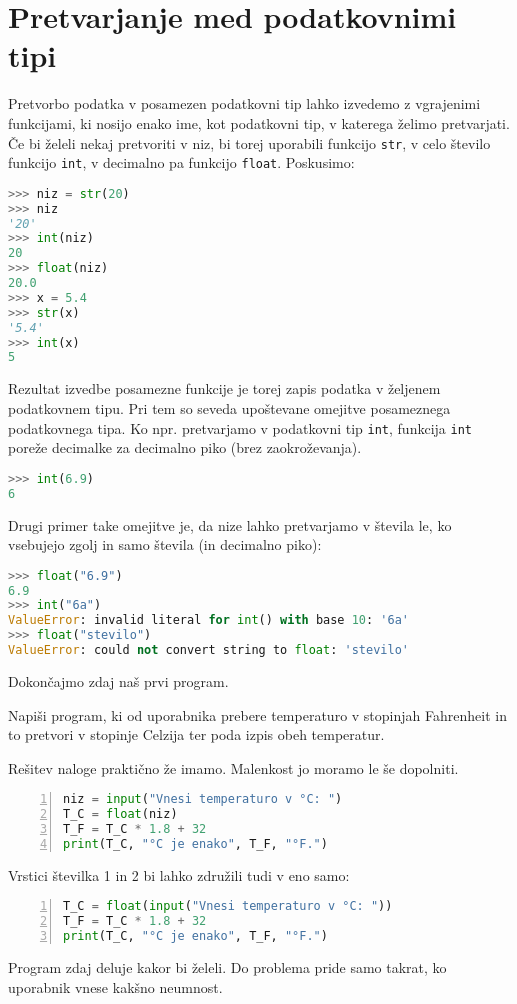 \section{Pretvarjanje med podatkovnimi tipi}
Pretvorbo podatka v posamezen podatkovni tip lahko izvedemo z vgrajenimi funkcijami, ki nosijo enako ime, kot podatkovni tip, v katerega želimo pretvarjati. Če bi želeli nekaj pretvoriti v niz, bi torej uporabili funkcijo \texttt{str}, v celo število funkcijo \texttt{int}, v decimalno pa funkcijo \texttt{float}. Poskusimo:
\begin{lstlisting}[language=Python]
>>> niz = str(20)
>>> niz
'20'
>>> int(niz)
20
>>> float(niz)
20.0
>>> x = 5.4
>>> str(x)
'5.4'
>>> int(x)
5
\end{lstlisting}
Rezultat izvedbe posamezne funkcije je torej zapis podatka v željenem podatkovnem tipu. Pri tem so seveda upoštevane omejitve posameznega podatkovnega tipa. Ko npr. pretvarjamo v podatkovni tip \texttt{int}, funkcija \texttt{int} poreže decimalke za decimalno piko (brez zaokroževanja). 
\begin{lstlisting}[language=Python]
>>> int(6.9)
6
\end{lstlisting}
Drugi primer take omejitve je, da nize lahko pretvarjamo v števila le, ko vsebujejo zgolj in samo števila (in decimalno piko):
\begin{lstlisting}[language=Python]
>>> float("6.9")
6.9
>>> int("6a")
ValueError: invalid literal for int() with base 10: '6a'
>>> float("stevilo")
ValueError: could not convert string to float: 'stevilo'
\end{lstlisting}

Dokončajmo zdaj naš prvi program.
\begin{zgled}
Napiši program, ki od uporabnika prebere temperaturo v stopinjah Fahrenheit in to pretvori v stopinje Celzija ter poda izpis obeh temperatur.
\end{zgled}
\begin{resitev}
Rešitev naloge praktično že imamo. Malenkost jo moramo le še dopolniti.
\begin{lstlisting}[language=Python,numbers=left]
niz = input("Vnesi temperaturo v °C: ")
T_C = float(niz)
T_F = T_C * 1.8 + 32
print(T_C, "°C je enako", T_F, "°F.")
\end{lstlisting}
Vrstici številka 1 in 2 bi lahko združili tudi v eno samo:
\begin{lstlisting}[language=Python,numbers=left]
T_C = float(input("Vnesi temperaturo v °C: "))
T_F = T_C * 1.8 + 32
print(T_C, "°C je enako", T_F, "°F.")
\end{lstlisting}
\end{resitev}
Program zdaj deluje kakor bi želeli. Do problema pride samo takrat, ko uporabnik vnese kakšno neumnost.

